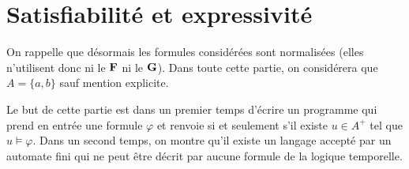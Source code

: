\section{Satisfiabilité et expressivité}

On rappelle que désormais les formules considérées sont normalisées (elles n'utilisent donc ni le ${\bf F}$ ni le ${\bf G}$). Dans toute cette partie, on considérera que $A=\{a, b\}$ sauf mention explicite.

\smallbreak

Le but de cette partie est dans un premier temps d'écrire un programme qui prend en entrée une formule $\varphi$ et renvoie  si et seulement s'il existe $u\in A^+$ tel que $u\vDash \varphi$. Dans un second temps, on montre qu'il existe un langage accepté par un automate fini qui ne peut être décrit par aucune formule de la logique temporelle.

